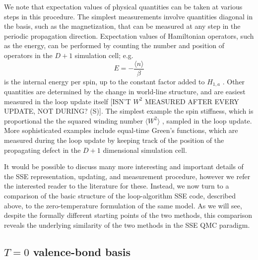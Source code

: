 \documentclass[vecphys]{svmult}
\begin{document}
We note that expectation values of physical quantities can be taken at various steps in this procedure.  The simplest measurements involve quantities diagonal in the basis, such as the magnetization, that can be measured at any step in the periodic propagation direction.  Expectation values of Hamiltonian operators, such as the energy, can be performed by counting the number and position of operators in the $D+1$ simulation cell; e.g.
\begin{equation}
E = - \frac{\langle n \rangle}{\beta}
\end{equation}
is the internal energy per spin, up to the constant factor added to $H_{1,a}$  \cite{Melko:Sandvik99}.
Other quantities are determined by the change in world-line structure, and are easiest measured in the loop update itself {\color{red}[ISN'T $W^2$ MEASURED AFTER EVERY UPDATE, NOT DURING? (S)]}.  The simplest example the spin stiffness, which is proportional the the squared winding number $\langle W^2 \rangle$ \cite{Melko:PC}, sampled in the loop update.  More sophisticated examples include equal-time Green's functions, which are measured during the loop update by keeping track of the position of the propagating defect in the $D+1$ dimensional simulation cell.

It would be possible to discuss many more interesting and important details of the SSE representation, updating, and measurement procedure, however we refer the interested reader to the literature for these.  Instead, we now turn to a comparison of the basic structure of the loop-algorithm SSE code, described above, to the zero-temperature formulation of the same model.  As we will see, despite the formally different starting points of the two methods, this comparison reveals the underlying similarity of the two methods in the SSE QMC paradigm.

\subsection{$T=0$ valence-bond basis} \label{Melko:VBB}
\end{document}
